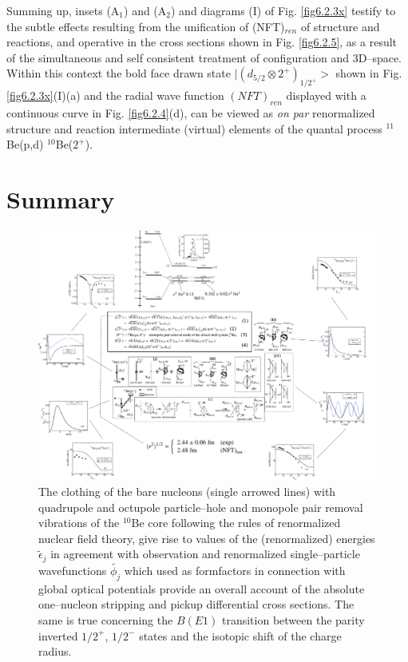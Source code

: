    
   Summing up, insets 
   (A$_1$) and (A$_2$)  and diagrams (I) of Fig. \ref{fig6.2.3x} testify to the subtle effects resulting  from the unification of (NFT)$_{ren}$ of structure 
   and reactions, and operative in the cross sections shown in Fig. \ref{fig6.2.5}, as a result of the 
   simultaneous and self consistent treatment of configuration and 3D--space.  Within this context
   the bold face drawn state $| (d_{5/2} \otimes 2^+)_{1/2^+}>$ shown in Fig. \ref{fig6.2.3x}(I)(a) 
   and the radial  wave function $(NFT)_{ren}$ displayed with a continuous curve in Fig. \ref{fig6.2.4}(d), can be viewed as {\it on par} renormalized structure and reaction 
   intermediate (virtual) elements of the quantal process $^{11}$Be(p,d) $^{10}$Be($2^+$).
   
   
\section{Summary}
      \begin{figure}
      \centerline{\includegraphics*[width=19.5cm,angle=0]{C8/figsC8/Fig6_3_1_v2}}
      	\caption{The clothing of the bare nucleons (single arrowed lines) with quadrupole and octupole particle--hole and monopole pair removal vibrations of the $^{10}$Be core following the rules of renormalized nuclear field theory, give rise to values of the (renormalized) energies $\tilde\epsilon_j$ in agreement with observation and renormalized single--particle wavefunctions $\tilde{\phi_j}$ which used as formfactors in connection with global optical potentials provide an overall account of the absolute one--nucleon stripping and pickup differential cross sections. The same is true concerning the $B(E1)$ transition between the parity inverted $1/2^+$, $1/2^-$ states and the isotopic shift of the charge radius.}\label{fig6.3.1}
      \end{figure} 
